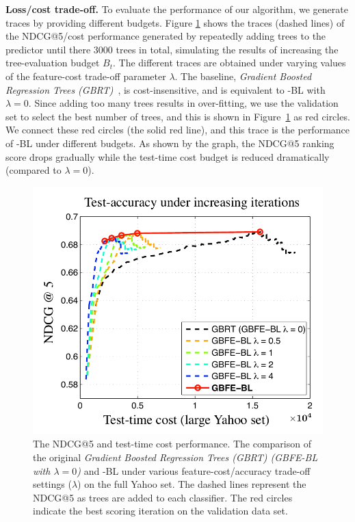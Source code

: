 \textbf{Loss/cost trade-off.}
To evaluate the performance of our algorithm, we generate traces by providing different budgets. Figure \ref{fig:precision_largeset} shows the traces (dashed lines) of the NDCG@5/cost performance generated by repeatedly adding trees to the predictor until there $3000$ trees in total, simulating the results of increasing the tree-evaluation budget $B_t$. The different traces are obtained under varying values of the feature-cost trade-off parameter $\lambda$. The baseline, \emph{Gradient Boosted Regression Trees (GBRT)}~\citep{friedman2001greedy}, is cost-insensitive, and is equivalent to \name{}-BL with $\lambda\!=\!0$. Since adding too many trees results in over-fitting, we use the validation set to select the best number of trees, and this is shown in Figure~\ref{fig:precision_largeset} as red circles. We connect these red circles (the solid red line), and this trace is the performance of \name{}-BL under different budgets. As shown by the graph, the NDCG@5 ranking score drops gradually while the test-time cost budget is reduced dramatically (compared to $\lambda\!=\!0$).

\begin{figure}[t]
\centerline{
\includegraphics[width = .67\textwidth]{plots/precision_largeset}
}
\vspace{-1.5ex}
\caption{The NDCG@5 and test-time cost performance. The comparison of the original \emph{Gradient Boosted Regression Trees (GBRT) (GBFE-BL with $\lambda = 0$)} and \name{}-BL under various feature-cost/accuracy trade-off settings ($\lambda$) on the full Yahoo set. The dashed lines represent the NDCG@5 as trees are added to each classifier. The red circles indicate the best scoring iteration on the validation data set. \label{fig:precision_largeset}}
\end{figure}

